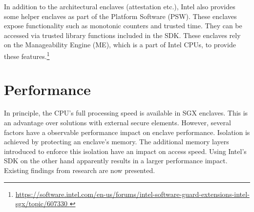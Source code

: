 In addition to the architectural enclaves (attestation etc.), Intel also provides some helper enclaves as part of the Platform Software (PSW).\label{ID_1056979156}
These enclaves expose functionality such as monotonic counters and trusted time.\cite[]{sgx-windows}\label{ID_1018912990}
They can be accessed via trusted library functions included in the SDK.\label{ID_296716001}
These enclaves rely on the Manageability Engine (ME), which is a part of Intel CPUs, to provide these features.\footnote{\url{https://software.intel.com/en-us/forums/intel-software-guard-extensions-intel-sgx/topic/607330 }}\label{ID_1422515691}

\section{Performance\label{ID_388809349}\label{section:sgx-perf}}
In principle, the CPU's full processing speed is available in SGX enclaves. This is an advantage over solutions with external secure elements.\label{ID_1639328080}
However, several factors have a observable performance impact on enclave performance.\label{ID_935750308}
Isolation is achieved by protecting an enclave's memory.\label{ID_88365959}
The additional memory layers introduced to enforce this isolation have an impact on access speed.\label{ID_921734519}
Using Intel's SDK on the other hand apparently results in a larger performance impact.\label{ID_589701637}
Existing findings from research are now presented.\label{ID_1990153751}

